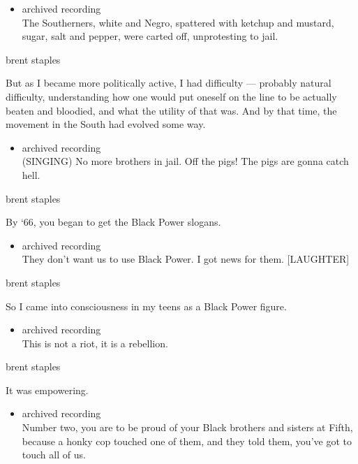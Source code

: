 \begin{itemize}
\tightlist
\item
  archived recording\\
  The Southerners, white and Negro, spattered with ketchup and mustard,
  sugar, salt and pepper, were carted off, unprotesting to jail.
\end{itemize}

brent staples

But as I became more politically active, I had difficulty --- probably
natural difficulty, understanding how one would put oneself on the line
to be actually beaten and bloodied, and what the utility of that was.
And by that time, the movement in the South had evolved some way.

\begin{itemize}
\tightlist
\item
  archived recording\\
  (SINGING) No more brothers in jail. Off the pigs! The pigs are gonna
  catch hell.
\end{itemize}

brent staples

By `66, you began to get the Black Power slogans.

\begin{itemize}
\tightlist
\item
  archived recording\\
  They don't want us to use Black Power. I got news for them.
  {[}LAUGHTER{]}
\end{itemize}

brent staples

So I came into consciousness in my teens as a Black Power figure.

\begin{itemize}
\tightlist
\item
  archived recording\\
  This is not a riot, it is a rebellion.
\end{itemize}

brent staples

It was empowering.

\begin{itemize}
\tightlist
\item
  archived recording\\
  Number two, you are to be proud of your Black brothers and sisters at
  Fifth, because a honky cop touched one of them, and they told them,
  you've got to touch all of us.
\end{itemize}

